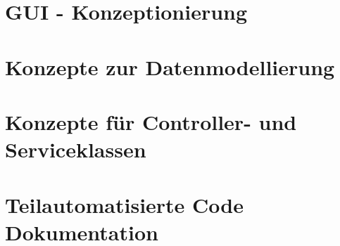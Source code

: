 \section{GUI - Konzeptionierung}

\section{Konzepte zur Datenmodellierung}

\section{Konzepte für Controller- und Serviceklassen}

\section{Teilautomatisierte Code Dokumentation}